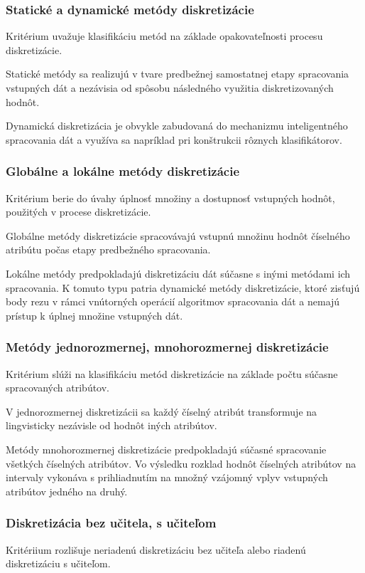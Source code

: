 \subsubsection{Statické a dynamické metódy diskretizácie}
Kritérium uvažuje klasifikáciu metód na základe opakovateľnosti procesu diskretizácie. 

Statické metódy sa realizujú v tvare predbežnej samostatnej etapy spracovania vstupných dát a nezávisia od spôsobu následného využitia diskretizovaných hodnôt. 

Dynamická diskretizácia je obvykle zabudovaná do mechanizmu inteligentného spracovania dát a využíva sa napríklad pri konštrukcii rôznych klasifikátorov. \cite{levashenkoProj}

\subsubsection{Globálne a lokálne metódy diskretizácie}
Kritérium berie do úvahy úplnosť množiny a dostupnosť vstupných hodnôt, použitých v procese diskretizácie. 

Globálne metódy diskretizácie spracovávajú vstupnú množinu hodnôt číselného atribútu počas etapy predbežného spracovania. 

Lokálne metódy predpokladajú diskretizáciu dát súčasne s inými metódami ich spracovania. K tomuto typu patria dynamické metódy diskretizácie, ktoré zisťujú body rezu v rámci vnútorných operácií algoritmov spracovania dát a nemajú prístup k úplnej množine vstupných dát. \cite{levashenkoProj}

\subsubsection{Metódy jednorozmernej, mnohorozmernej diskretizácie}
Kritérium slúži na klasifikáciu metód diskretizácie na základe počtu súčasne spracovaných atribútov. 

V jednorozmernej diskretizácii sa každý číselný atribút transformuje na lingvisticky nezávisle od hodnôt iných atribútov. 

Metódy mnohorozmernej diskretizácie predpokladajú súčasné spracovanie všetkých číselných atribútov. 
Vo výsledku rozklad hodnôt číselných atribútov na intervaly vykonáva s prihliadnutím na množný vzájomný vplyv vstupných atribútov jedného na druhý. \cite{levashenkoProj}

\subsubsection{Diskretizácia bez učitela, s učiteľom}
Kritériium rozlišuje neriadenú diskretizáciu bez učiteľa alebo riadenú diskretizáciu s učiteľom. 

